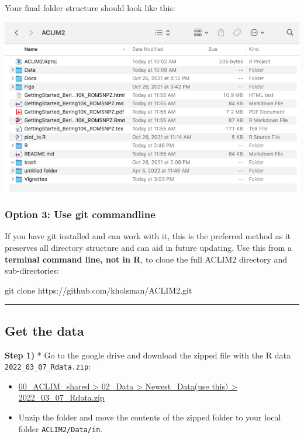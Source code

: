 \documentclass[
]{article}
\newenvironment{Shaded}{\begin{snugshade}}{\end{snugshade}}
\newcommand{\FunctionTok}[1]{\textcolor[rgb]{0.00,0.00,0.00}{#1}}
\newcommand{\NormalTok}[1]{#1}
\begin{document}
Your final folder structure should look like this:

\includegraphics[width=1\textwidth,height=\textheight]{Figs/ACLIM_dir.png}

\hypertarget{option-3-use-git-commandline}{%
\subsubsection{Option 3: Use git
commandline}\label{option-3-use-git-commandline}}

If you have git installed and can work with it, this is the preferred
method as it preserves all directory structure and can aid in future
updating. Use this from a \textbf{terminal command line, not in R}, to
clone the full ACLIM2 directory and sub-directories:

\begin{Shaded}
\begin{Highlighting}[]
    \FunctionTok{git}\NormalTok{ clone https://github.com/kholsman/ACLIM2.git}
\end{Highlighting}
\end{Shaded}

\begin{center}\rule{0.5\linewidth}{0.5pt}\end{center}

\hypertarget{get-the-data}{%
\subsection{Get the data}\label{get-the-data}}

\textbf{Step 1)} * Go to the google drive and download the zipped file
with the R data \texttt{2022\_03\_07\_Rdata.zip}:

\begin{itemize}
\item
  \href{https://drive.google.com/drive/folders/11BQEfNEl9vvrN-V0LgS67XS4aLE9pNzz}{00\_ACLIM\_shared
  \textgreater{} 02\_Data \textgreater{} Newest\_Data(use this)
  \textgreater{} 2022\_03\_07\_Rdata.zip}
\item
  Unzip the folder and move the contents of the zipped folder to your
  local folder \texttt{ACLIM2/Data/in}.
\end{itemize}
\end{document}
